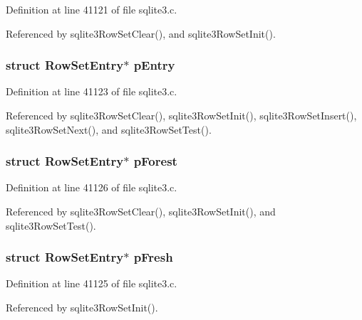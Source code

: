 Definition at line 41121 of file sqlite3.\+c.



Referenced by sqlite3\+Row\+Set\+Clear(), and sqlite3\+Row\+Set\+Init().

\hypertarget{struct_row_set_aa89a683366c2e9acf50c9f25acee175b}{}
\subsubsection[{p\+Entry}]{\setlength{\rightskip}{0pt plus 5cm}struct {\bf Row\+Set\+Entry}$\ast$ p\+Entry}\label{struct_row_set_aa89a683366c2e9acf50c9f25acee175b}


Definition at line 41123 of file sqlite3.\+c.



Referenced by sqlite3\+Row\+Set\+Clear(), sqlite3\+Row\+Set\+Init(), sqlite3\+Row\+Set\+Insert(), sqlite3\+Row\+Set\+Next(), and sqlite3\+Row\+Set\+Test().

\hypertarget{struct_row_set_ac18827ae3e7b5bda6e89256c5f551165}{}
\subsubsection[{p\+Forest}]{\setlength{\rightskip}{0pt plus 5cm}struct {\bf Row\+Set\+Entry}$\ast$ p\+Forest}\label{struct_row_set_ac18827ae3e7b5bda6e89256c5f551165}


Definition at line 41126 of file sqlite3.\+c.



Referenced by sqlite3\+Row\+Set\+Clear(), sqlite3\+Row\+Set\+Init(), and sqlite3\+Row\+Set\+Test().

\hypertarget{struct_row_set_af197f8fa85fa1582df97f18e243cb666}{}
\subsubsection[{p\+Fresh}]{\setlength{\rightskip}{0pt plus 5cm}struct {\bf Row\+Set\+Entry}$\ast$ p\+Fresh}\label{struct_row_set_af197f8fa85fa1582df97f18e243cb666}


Definition at line 41125 of file sqlite3.\+c.



Referenced by sqlite3\+Row\+Set\+Init().

